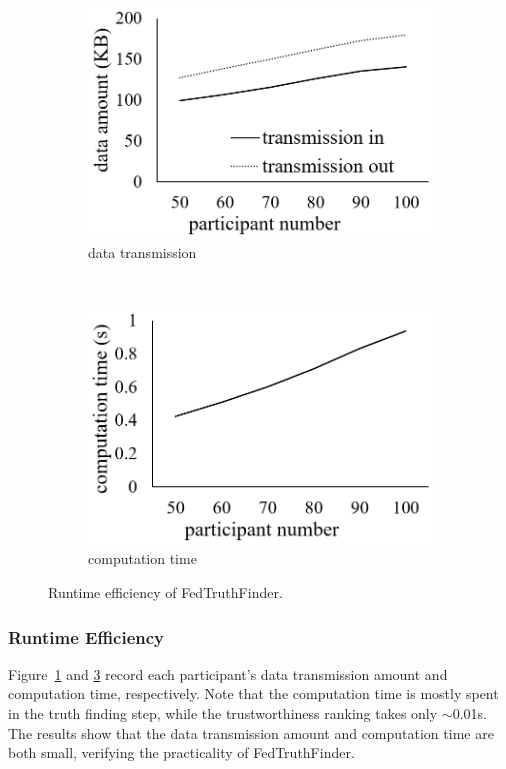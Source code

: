 \begin{figure}[t]%
	\centering
	\begin{subfigure}[t]{.3\linewidth}
		\includegraphics[width=1\linewidth]{./fig/data_transmission_traffic.PNG}
		\caption{data transmission}
		\label{fig:data_transmission}
	\end{subfigure}
	\ 
	\begin{subfigure}[t]{.3\linewidth}
		\includegraphics[width=1\linewidth]{./fig/computation_time_traffic.PNG}
		\caption{computation time}
		\label{fig:computation_time}
	\end{subfigure}
	\caption{Runtime efficiency of FedTruthFinder.}
\end{figure}

\subsubsection{Runtime Efficiency} Figure~\ref{fig:data_transmission} and \ref{fig:computation_time} record each participant's data transmission amount and computation time, respectively. Note that the computation time is mostly spent in the truth finding step, while the trustworthiness ranking takes only $\sim$0.01s. The results show that the data transmission amount and computation time are both small, verifying the practicality of FedTruthFinder.

